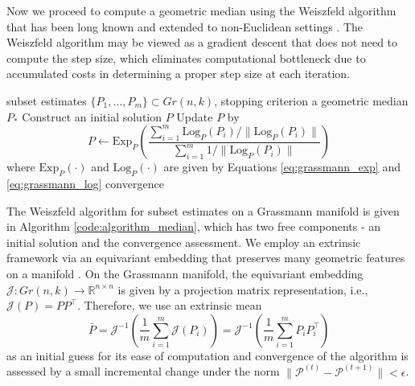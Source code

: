 \documentclass[11pt]{article}
\begin{document}
Now we proceed to compute a geometric median using the Weiszfeld algorithm that has been long known and extended to non-Euclidean settings \citep{weiszfeld_sur_1937, eckhardt_webers_1980, fletcher_geometric_2009, aftab_generalized_2015}. The Weiszfeld algorithm may be viewed as a gradient descent that does not need to compute the step size, which eliminates computational bottleneck due to accumulated costs in determining a proper step size at each iteration. 
	\begin{algorithm}[!th]
		\caption{Weiszfeld Algorithm for Geometric Median of Subset Estimates}
		\label{code:algorithm_median}
		\begin{algorithmic}
			\REQUIRE subset estimates $\lbrace P_1,\ldots,P_m\rbrace \subset Gr(n,k)$, stopping criterion 
			\ENSURE a geometric median $P_*$
			\STATE Construct an initial solution $P$ 
			\REPEAT {}
			\STATE Update $P$ by
			\begin{equation*}
			P \leftarrow \text{Exp}_P \left(\frac{\sum_{i=1}^m \text{Log}_P (P_i) / \|\text{Log}_P (P_i)\|}{\sum_{i=1}^m 1/\|\text{Log}_P (P_i)\|}\right)
			\end{equation*}
			where $\text{Exp}_P (\cdot)$ and $\text{Log}_P (\cdot)$ are given by Equations \eqref{eq:grassmann_exp} and \eqref{eq:grassmann_log}
			\UNTIL convergence
		\end{algorithmic}
	\end{algorithm}
	
	The Weiszfeld algorithm for subset estimates on a Grassmann manifold is given in Algorithm \ref{code:algorithm_median}, which has two free components - an initial solution and the convergence assessment. We employ an extrinsic framework via an equivariant embedding that preserves many geometric features on a manifold \citep{bhattacharya_nonparametric_2015-1}. On the Grassmann manifold, the equivariant embedding $\mathcal{J}:Gr(n,k)\rightarrow \mathbb{R}^{n\times n}$ is given by a projection matrix representation, i.e., $\mathcal{J}(P) = PP^\top$. Therefore, we use an extrinsic mean 
	\begin{equation*}
	\bar{P} = \mathcal{J}^{-1} \left( \frac{1}{m} \sum_{i=1}^m \mathcal{J}(P_i)\right) = \mathcal{J}^{-1} \left( \frac{1}{m} \sum_{i=1}^m P_i P_i^\top \right)
	\end{equation*}
	as an initial guess for its ease of computation and convergence of the algorithm is assessed by a small incremental change under the norm $\| \mathcal{P}^{(t)} - \mathcal{P}^{(t+1)} \| < \epsilon$. 
	
\end{document}
